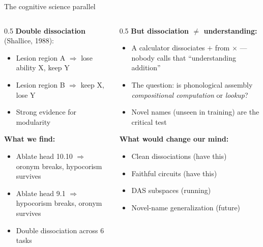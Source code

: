 \documentclass[10pt,aspectratio=169]{beamer}
\begin{document}
\begin{frame}{The cognitive science parallel}
\hypertarget{sl:cogsci}{}

\begin{columns}[T]
\begin{column}{0.5\textwidth}
\textbf{Double dissociation} (Shallice, 1988):
\begin{itemize}
  \item Lesion region A $\Rightarrow$ lose ability X, keep Y
  \item Lesion region B $\Rightarrow$ keep X, lose Y
  \item Strong evidence for modularity
\end{itemize}

\vspace{0.5em}
\textbf{What we find:}
\begin{itemize}
  \item Ablate head 10.10 $\Rightarrow$ oronym breaks, hypocorism survives
  \item Ablate head 9.1 $\Rightarrow$ hypocorism breaks, oronym survives
  \item \textcolor{circuit}{Double dissociation across 6 tasks}
\end{itemize}
\end{column}

\begin{column}{0.5\textwidth}
\textbf{But dissociation $\neq$ understanding:}
\begin{itemize}
  \item A calculator dissociates $+$ from $\times$ --- nobody calls that ``understanding addition''
  \item The question: is phonological assembly \emph{compositional computation} or \emph{lookup}?
  \item Novel names (unseen in training) are the critical test
\end{itemize}

\vspace{0.5em}
\textbf{What would change our mind:}
\begin{itemize}
  \item[\textcolor{circuit}{$\checkmark$}] Clean dissociations {\scriptsize (have this)}
  \item[\textcolor{circuit}{$\checkmark$}] Faithful circuits {\scriptsize (have this)}
  \item[\textcolor{backbone}{?}] DAS subspaces {\scriptsize (running)}
  \item[\textcolor{phoneme}{$\times$}] Novel-name generalization {\scriptsize (future)}
\end{itemize}
\end{column}
\end{columns}

\end{frame}
\end{document}
